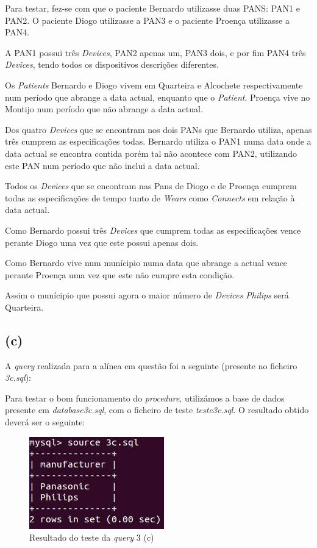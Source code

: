 \documentclass[a4paper]{article}
\begin{document}
	Para testar, fez-se com que o paciente Bernardo utilizasse duas PANS: PAN1
	e PAN2. O paciente Diogo utilizasse a PAN3 e o paciente Proença utilizasse a PAN4.
	
	A PAN1 possui três \textit{Devices}, PAN2 apenas um, PAN3 dois, e por
	fim PAN4 três \textit{Devices}, tendo todos os dispositivos descrições diferentes.
	
	Os \textit{Patients} Bernardo e Diogo vivem em Quarteira e Alcochete respectivamente num período que abrange a data actual, enquanto que o \textit{Patient}.
	Proença vive no Montijo num período que não abrange a data actual.
	
	Dos quatro \textit{Devices} que se encontram nos dois PANs que Bernardo utiliza, apenas
	três cumprem as especificações todas. Bernardo utiliza o PAN1 numa data 
	onde a data actual se encontra contida porém tal não acontece com PAN2,
	utilizando este PAN num período que não inclui a data actual.
	
	Todos os \textit{Devices} que se encontram nas Pans de Diogo e de Proença
	cumprem todas as especificações de tempo tanto de \textit{Wears} como \textit{Connects}
	em relação à data actual.
	
	Como Bernardo possui três \textit{Devices} que cumprem todas as especificações
	vence perante Diogo uma vez que este possui apenas dois.
	
	Como Bernardo vive num munícipio numa data que abrange a actual vence
	perante Proença uma vez que este não cumpre esta condição.
	
	Assim o munícipio que possui agora o maior número de \textit{Devices Philips}
	será Quarteira.
	
\subsection*{(c)}
A \textit{query} realizada para a alínea em questão foi a seguinte (presente no ficheiro \textit{3c.sql}):



Para testar o bom funcionamento do \textit{procedure}, utilizámos a base de dados presente em \textit{database3c.sql}, com o ficheiro de teste \textit{teste3c.sql}.
O resultado obtido deverá ser o seguinte:

\begin{figure}[ht!]
\centering
\includegraphics[scale=0.53]{teste3c.jpg}
\caption{Resultado do teste da \textit{query} 3 (c)}
\end{figure}
\end{document}
